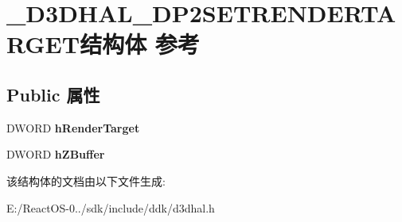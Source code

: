 \hypertarget{struct___d3_d_h_a_l___d_p2_s_e_t_r_e_n_d_e_r_t_a_r_g_e_t}{}\section{\+\_\+\+D3\+D\+H\+A\+L\+\_\+\+D\+P2\+S\+E\+T\+R\+E\+N\+D\+E\+R\+T\+A\+R\+G\+E\+T结构体 参考}
\label{struct___d3_d_h_a_l___d_p2_s_e_t_r_e_n_d_e_r_t_a_r_g_e_t}
\subsection*{Public 属性}
\begin{DoxyCompactItemize}
\item 
\mbox{\label{struct___d3_d_h_a_l___d_p2_s_e_t_r_e_n_d_e_r_t_a_r_g_e_t_a31b35176f2bc4f7e8c6c9824226cf24f}} 
D\+W\+O\+RD {\bfseries h\+Render\+Target}
\item 
\mbox{\label{struct___d3_d_h_a_l___d_p2_s_e_t_r_e_n_d_e_r_t_a_r_g_e_t_a51f5beddecc02b47dcca9e728aaf60c4}} 
D\+W\+O\+RD {\bfseries h\+Z\+Buffer}
\end{DoxyCompactItemize}


该结构体的文档由以下文件生成\+:\begin{DoxyCompactItemize}
\item 
E\+:/\+React\+O\+S-\/0../sdk/include/ddk/d3dhal.\+h\end{DoxyCompactItemize}
